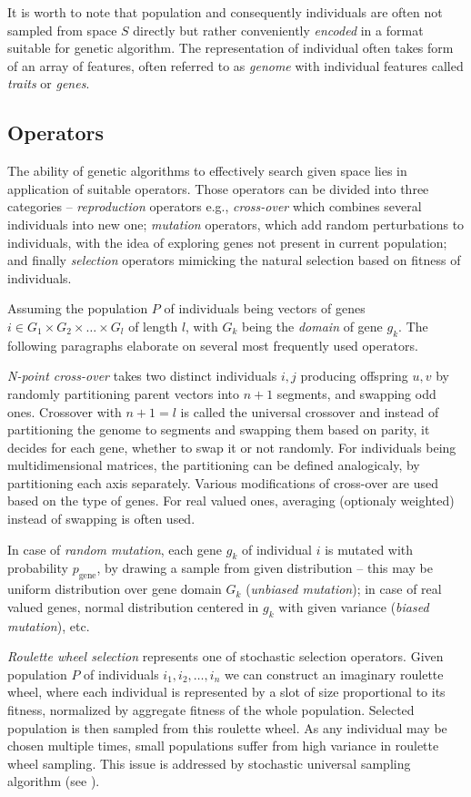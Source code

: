 It is worth to note that population and consequently individuals are often not sampled from space $S$ directly but rather conveniently \emph{encoded} in a format suitable for genetic algorithm. The representation of individual often takes form of an array of features, often referred to as \emph{genome} with individual features called \emph{traits} or \emph{genes}.

\subsection{Operators}
The ability of genetic algorithms to effectively search given space lies in application of suitable operators. Those operators can be divided into three categories -- \emph{reproduction} operators e.g., \emph{cross-over} which combines several individuals into new one; \emph{mutation} operators, which add random perturbations to individuals, with the idea of exploring genes not present in current population; and finally \emph{selection} operators mimicking the natural selection based on fitness of individuals.

Assuming the population $P$ of individuals being vectors of genes $i \in G_1 \times G_2 \times \dots \times G_l$ of length $l$, with $G_k$ being the \emph{domain} of gene $g_k$. The following paragraphs elaborate on several most frequently used operators.

\emph{N-point cross-over} takes two distinct individuals $i, j$ producing offspring $u, v$ by randomly partitioning parent vectors into $n+1$ segments, and swapping odd ones. Crossover with $n + 1 = l$ is called the universal crossover and instead of partitioning the genome to segments and swapping them based on parity, it decides for each gene, whether to swap it or not randomly. For individuals being multidimensional matrices, the partitioning can be defined analogicaly, by partitioning each axis separately. Various modifications of cross-over are used based on the type of genes. For real valued ones, averaging (optionaly weighted) instead of swapping is often used.

In case of \emph{random mutation}, each gene $g_k$ of individual $i$ is mutated with probability $p_{\text{gene}}$, by drawing a sample from given distribution -- this may be uniform distribution over gene domain $G_k$ (\emph{unbiased mutation}); in case of real valued genes, normal distribution centered in $g_k$ with given variance (\emph{biased mutation}), etc.

\emph{Roulette wheel selection} represents one of stochastic selection operators. Given population $P$ of individuals $i_1, i_2, \dots, i_n$ we can construct an imaginary roulette wheel, where each individual is represented by a slot of size proportional to its fitness, normalized by aggregate fitness of the whole population. Selected population is then sampled from this roulette wheel. As any individual may be chosen multiple times, small populations suffer from high variance in roulette wheel sampling. This issue is addressed by stochastic universal sampling algorithm (see \cite{evolution}).

